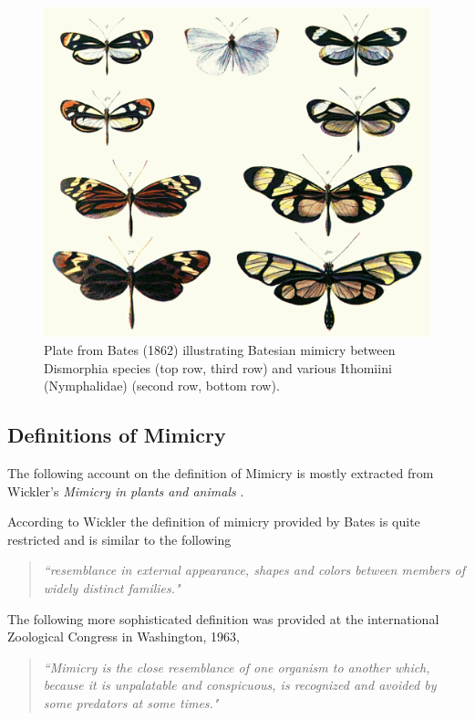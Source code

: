 \begin{figure}[H]
	\centering
	\includegraphics[scale=1]{images/Batesplate_ArM}
	\caption[Plate from Bates (1862) illustrating Batesian mimicry]{Plate from Bates (1862) illustrating Batesian mimicry between Dismorphia species (top row, third row) and various Ithomiini (Nymphalidae) (second row, bottom row). \cite{bates1862}}
	\label{fig:batesian-butterfly}
\end{figure}

\subsection{Definitions of Mimicry}
The following account on the definition of Mimicry is mostly extracted from Wickler's \textit{Mimicry in plants and animals} \cite{wickler1986}. 

According to Wickler the definition of mimicry provided by Bates \cite{bates1862} is quite restricted and is similar to the following

\begin{quote}
\textsl{``resemblance in external appearance, shapes and colors between members of widely distinct families."}
\end{quote}

The following more sophisticated definition was provided at the international Zoological Congress in Washington, 1963,

\begin{quote}
\textsl{``Mimicry is the close resemblance of one organism to another which, because it is unpalatable and conspicuous, is recognized and avoided by some predators at some times."}
\end{quote}

